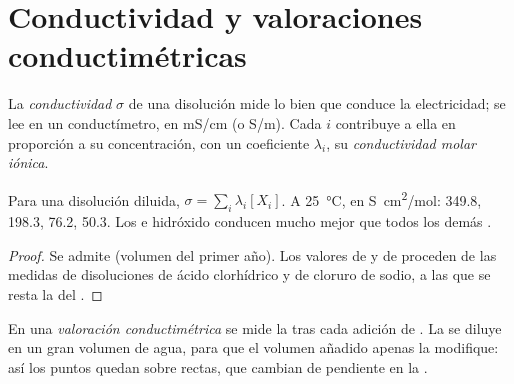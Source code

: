 \section{Conductividad y valoraciones conductimétricas}

\begin{definition}\label{def:g12:ph-conductivity-titrations:conductivity}
La \emph{conductividad} $\sigma$ de una disolución
mide lo bien que conduce la electricidad; se lee en un conductímetro, en
\si{mS/cm} (o \si{S/m}). Cada  $i$ contribuye a ella en proporción a
su concentración, con un coeficiente $\lambda_i$, su
\emph{conductividad molar iónica}.
\end{definition}

\begin{proposition}\label{prop:g12:ph-conductivity-titrations:kohlrausch}
Para una disolución diluida, $\sigma = \sum_i \lambda_i [X_i]$. A
\qty{25}{\celsius}, en \si{S.cm^2/mol}:  349.8,  198.3,
 76.2,  50.3. Los  e hidróxido conducen mucho
mejor que todos los demás .
\end{proposition}

\begin{proof}
Se admite (volumen del primer año). Los valores de  y de
 proceden de las  medidas de disoluciones de
ácido clorhídrico y de cloruro de sodio, a las que se resta la del
.
\end{proof}

\begin{definition}\label{def:g12:ph-conductivity-titrations:conductimetric}
En una \emph{valoración conductimétrica}
se mide la  tras cada adición de . La  se diluye en un gran volumen de agua, para que el volumen
añadido apenas la modifique: así los puntos quedan sobre rectas, que
cambian de pendiente en la .
\end{definition}

